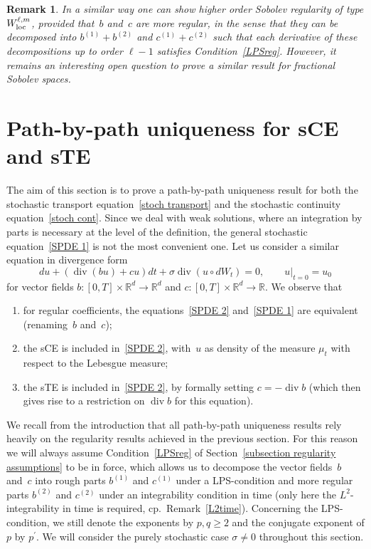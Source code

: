 \documentclass[a4paper,10pt]{article}
\newtheorem{remark}[theorem]{Remark}
\newcommand\1{\mathbbm{1}}
\newcommand\loc{{\rm loc}}
\DeclareMathOperator{\diverg}{div}
\numberwithin{equation}{section}
\begin{document}
\begin{remark}
In a similar way one can show higher order Sobolev regularity of type $W^{\ell,m}_{\loc}$, provided that~$b$ and~$c$ are more regular, in the sense that they can be decomposed into $b^{(1)}+b^{(2)}$ and $c^{(1)}+c^{(2)}$ such that each derivative of these decompositions up to order $\ell-1$ satisfies Condition~\ref{LPSreg}. However, it remains an interesting open question to prove a similar result for fractional Sobolev spaces.
\end{remark}

\section{Path-by-path uniqueness for sCE and sTE}\label{pbp_section}

The aim of this section is to prove a path-by-path uniqueness result for both the stochastic transport equation~\eqref{stoch transport} and the stochastic continuity equation~\eqref{stoch cont}. Since we deal with weak solutions, where an integration by parts is necessary at the level of the definition, the general stochastic equation~\eqref{SPDE 1} is not the most convenient one. Let us consider a similar equation in divergence form
\begin{equation}
du+ (  \diverg (bu)  +cu )  dt+\sigma
\diverg  (  u\circ dW_{t})  =0,\qquad u|_{t=0}=u_{0}
\label{SPDE 2}
\end{equation}
for vector fields $b \colon [0,T] \times \mathbb{R}^d \to \mathbb{R}^d$ and $c \colon   [0,T] \times \mathbb{R}^d \to \mathbb{R}$. We observe that\begin{enumerate}[font=\normalfont, label=(\roman{*}), ref=(\roman{*})]
  \item for regular coefficients, the equations~\eqref{SPDE 2} and~\eqref{SPDE 1} are equivalent (renaming~$b$ and~$c$);
  \item the sCE is included in~\eqref{SPDE 2}, with~$u$ as density of the measure $\mu_t$ with respect to the Lebesgue measure;
  \item the sTE is included in~\eqref{SPDE 2}, by formally setting $c=-\diverg b$ (which then gives rise to a restriction  on $\diverg b$ for this equation).
\end{enumerate}

We recall from the introduction that all path-by-path uniqueness results rely heavily on the regularity results achieved in the previous section. For this reason we will always assume Condition~\ref{LPSreg} of Section~\ref{subsection regularity assumptions} to be in force, which allows us to decompose the vector fields~$b$ and~$c$ into rough parts $b^{(1)}$ and $c^{(1)}$ under a LPS-condition and more regular parts $b^{(2)}$ and $c^{(2)}$ under an integrability condition in time (only here the $L^2$-integrability in time is required, cp.~Remark~\ref{L2time}). Concerning the LPS-condition, we still denote the exponents by $p,q \geq 2$ and the conjugate exponent of $p$ by $p^{\prime}$. We will consider the purely stochastic case $\sigma\neq0$ throughout this section.
\end{document}
